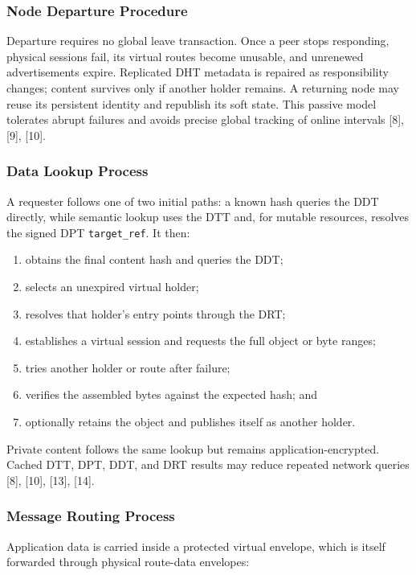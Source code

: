 \documentclass[12pt,a4paper]{article}
\begin{document}
\subsubsection{Node Departure Procedure}

Departure requires no global leave transaction. Once a peer stops responding, physical
sessions fail, its virtual routes become unusable, and unrenewed advertisements expire.
Replicated DHT metadata is repaired as responsibility changes; content survives only
if another holder remains. A returning node may reuse its persistent identity and
republish its soft state. This passive model tolerates abrupt failures and avoids
precise global tracking of online intervals [8], [9], [10].

\subsubsection{Data Lookup Process}

A requester follows one of two initial paths: a known hash queries the DDT directly,
while semantic lookup uses the DTT and, for mutable resources, resolves the signed DPT
\texttt{target\_ref}. It then:

\begin{enumerate}
    \item obtains the final content hash and queries the DDT;
    \item selects an unexpired virtual holder;
    \item resolves that holder's entry points through the DRT;
    \item establishes a virtual session and requests the full object or byte ranges;
    \item tries another holder or route after failure;
    \item verifies the assembled bytes against the expected hash; and
    \item optionally retains the object and publishes itself as another holder.
\end{enumerate}

Private content follows the same lookup but remains application-encrypted. Cached DTT,
DPT, DDT, and DRT results may reduce repeated network queries [8], [10], [13], [14].

\subsubsection{Message Routing Process}

Application data is carried inside a protected virtual envelope, which is itself
forwarded through physical route-data envelopes:
\end{document}

